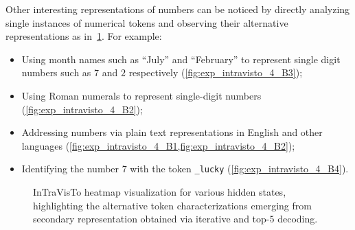 Other interesting representations of numbers can be noticed by directly analyzing single instances of numerical tokens and observing their alternative representations as in~\cref{fig:exp_intravisto_4_B}.
For example:
\begin{itemize}
    \item Using month names such as ``July'' and ``February'' to represent single digit numbers such as $7$ and $2$ respectively (\cref{fig:exp_intravisto_4_B3});
    \item Using Roman numerals to represent single-digit numbers (\cref{fig:exp_intravisto_4_B2});
    \item Addressing numbers via plain text representations in English and other languages (\cref{fig:exp_intravisto_4_B1,fig:exp_intravisto_4_B2});
    \item Identifying the number $7$ with the token \texttt{\_lucky} (\cref{fig:exp_intravisto_4_B4}).
\end{itemize}

\begin{figure}[t!]
    \centering
    \begingroup
    \captionsetup{width=0.8\textwidth/2}
    \quad
    \endgroup
    \caption[InTraVisTo heatmap visualization for various hidden states.]{InTraVisTo heatmap visualization for various hidden states, highlighting the alternative token characterizations emerging from secondary representation obtained via iterative and top-$5$ decoding.}
    \label{fig:exp_intravisto_4_B}
\end{figure}

